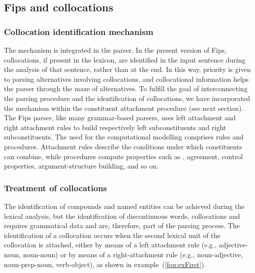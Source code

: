 \documentclass[output=paper]{langsci/langscibook}
\begin{document}
\subsection{Fips and collocations}
\subsubsection{Collocation identification mechanism}
\label{fou:ref:subsubsec:colidme}
The  mechanism is integrated in the parser. In the pre\-sent version of Fips, collocations, if present in the lexicon, are identified in the input sentence during the analysis of that sentence, rather than at the end. In this way, priority is given to parsing alternatives involving collocations, and collocational information helps the parser through the maze of alternatives. 
To fulfill the goal of interconnecting the parsing procedure and the identification of collocations, we have incorporated the  mechanism within the constituent attachment procedure (see next section). The Fips parser, like many grammar-based parsers, uses left attachment and right attachment rules to build respectively left subconstituents and right subconstituents. The  used for the computational modelling comprises rules and procedures. Attachment rules describe the conditions under which constituents can combine, while procedures compute properties such as , agreement, control properties, argument-structure building, and so on. 

\subsubsection{Treatment of collocations}

The identification of compounds and named entities can be achieved during the lexical analysis, but the identification of discontinuous words, collocations and  requires grammatical data and are, therefore, part of the parsing process. The identification of a collocation occurs when the second lexical unit of the collocation is attached, either by means of a left attachment rule (e.g., adjective-noun, noun-noun) or by means of a right-attachment rule (e.g., noun-adjective, noun-prep-noun, verb-object), as shown in example~(\ref{fou:exFirst}). %


\end{document}
